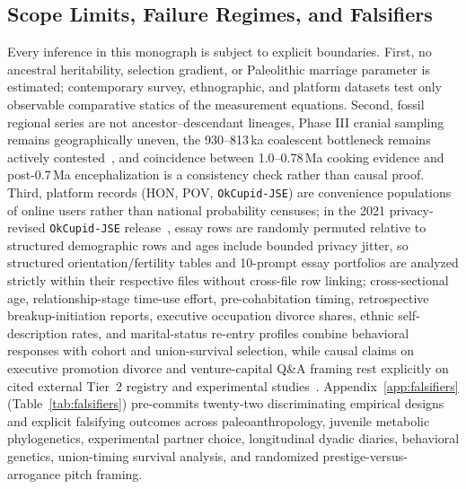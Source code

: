\subsection{Scope Limits, Failure Regimes, and Falsifiers}
Every inference in this monograph is subject to explicit boundaries. First, no ancestral heritability, selection gradient, or Paleolithic marriage parameter is estimated; contemporary survey, ethnographic, and platform datasets test only observable comparative statics of the measurement equations. Second, fossil regional series are not ancestor--descendant lineages, Phase III cranial sampling remains geographically uneven, the 930--813\,ka coalescent bottleneck remains actively contested~\cite{hu2023,deng2025,cousins2025}, and coincidence between 1.0--0.78\,Ma cooking evidence and post-0.7\,Ma encephalization is a consistency check rather than causal proof. Third, platform records (HON, POV, \texttt{OkCupid-JSE}) are convenience populations of online users rather than national probability censuses; in the 2021 privacy-revised \texttt{OkCupid-JSE} release~\cite{kim2015}, essay rows are randomly permuted relative to structured demographic rows and ages include bounded privacy jitter, so structured orientation/fertility tables and 10-prompt essay portfolios are analyzed strictly within their respective files without cross-file row linking; cross-sectional age, relationship-stage time-use effort, pre-cohabitation timing, retrospective breakup-initiation reports, executive occupation divorce shares, ethnic self-description rates, and marital-status re-entry profiles combine behavioral responses with cohort and union-survival selection, while causal claims on executive promotion divorce and venture-capital Q\&A framing rest explicitly on cited external Tier~2 registry and experimental studies~\cite{folke2020,bertrand2015,bursztyn2017,kanze2018}. Appendix~\ref{app:falsifiers} (Table~\ref{tab:falsifiers}) pre-commits twenty-two discriminating empirical designs and explicit falsifying outcomes across paleoanthropology, juvenile metabolic phylogenetics, experimental partner choice, longitudinal dyadic diaries, behavioral genetics, union-timing survival analysis, and randomized prestige-versus-arrogance pitch framing.

